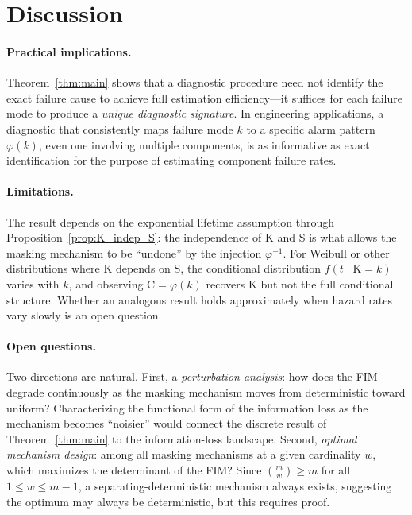 \documentclass[preprint,12pt]{elsarticle}
\newcommand{\RV}[1]{\mathrm{#1}}
\newcommand{\sv}{\RV{S}}           %
\newcommand{\cand}{\RV{C}}         %
\newcommand{\pdf}{f}
\theoremstyle{definition}
\theoremstyle{remark}
\begin{document}
\section{Discussion}
\label{sec:discussion}

\paragraph{Practical implications.}
Theorem~\ref{thm:main} shows that a diagnostic procedure need not identify the
exact failure cause to achieve full estimation efficiency---it suffices for each
failure mode to produce a \emph{unique diagnostic signature}. In engineering
applications, a diagnostic that consistently maps failure mode $k$ to a specific
alarm pattern $\varphi(k)$, even one involving multiple components, is as
informative as exact identification for the purpose of estimating component
failure rates.

\paragraph{Limitations.}
The result depends on the exponential lifetime assumption through
Proposition~\ref{prop:K_indep_S}: the independence of $\RV{K}$ and $\sv$ is what
allows the masking mechanism to be ``undone'' by the injection $\varphi^{-1}$.
For Weibull or other distributions where $\RV{K}$ depends on $\sv$, the
conditional distribution $\pdf(t \mid \RV{K} = k)$ varies with $k$, and
observing $\cand = \varphi(k)$ recovers $\RV{K}$ but not the full conditional
structure. Whether an analogous result holds approximately when hazard rates vary
slowly is an open question.

\paragraph{Open questions.}
Two directions are natural. First, a \emph{perturbation analysis}: how does the
FIM degrade continuously as the masking mechanism moves from deterministic toward
uniform? Characterizing the functional form of the information loss as the
mechanism becomes ``noisier'' would connect the discrete result of
Theorem~\ref{thm:main} to the information-loss landscape. Second,
\emph{optimal mechanism design}: among all masking mechanisms at a given
cardinality $w$, which maximizes the determinant of the FIM? Since
$\binom{m}{w} \geq m$ for all $1 \leq w \leq m-1$, a
separating-deterministic mechanism always exists, suggesting the
optimum may always be deterministic, but this requires proof.
\end{document}
